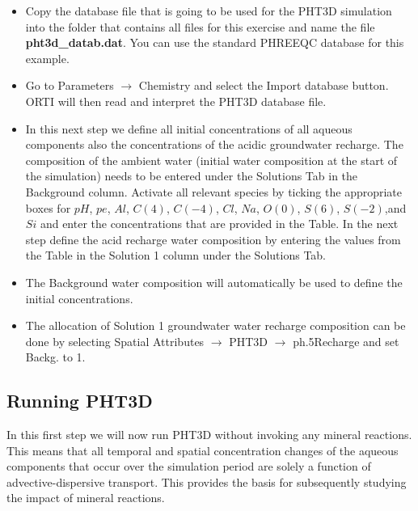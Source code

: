 \begin{itemize}

\item Copy the database file that is going to be used for the PHT3D simulation
into the folder that contains all files for this exercise and name the file {\color{red} \textbf{pht3d\_datab.dat}}. You can use the standard PHREEQC database for this example.

\item Go to {\color{blue}Parameters} $\rightarrow$ {\color{blue}Chemistry} and select the
{\color{blue}Import database} button. ORTI will then read and interpret 
the PHT3D database file.

\item In this next step we define all initial concentrations of all aqueous components
also the concentrations of the acidic groundwater recharge. The composition of the ambient water (initial water composition at the start of the simulation) 
needs to be entered under the {\color{blue}Solutions} Tab in the {\color{blue}Background} column.
Activate all relevant species by ticking the appropriate boxes for 
$pH$, $pe$,  $Al$, $C(4)$,  $C(-4)$, $Cl$, $Na$, $O(0)$, $S(6)$, $S(-2)$,and $Si$
and enter the concentrations that are provided in the Table. In the next step define the acid 
recharge water composition by entering the values from the Table in the {\color{blue}Solution 1} column 
under the {\color{blue}Solutions} Tab.  

\item The {\color{blue}Background} water composition will automatically be used to define the 
initial concentrations.

\item The allocation of {\color{blue}Solution 1} groundwater water recharge composition can be
done by selecting {\color{blue}Spatial Attributes} $\rightarrow$ {\color{blue}PHT3D} $\rightarrow$ {\color{blue} ph.5Recharge} and set {\color{blue}Backg.} to 1.  

\end{itemize}

\subsection[Running PHT3D]{Running PHT3D}

In this first step we will now run PHT3D without invoking any mineral reactions. This means that all temporal and spatial concentration changes of the aqueous components that occur over the simulation period are solely a function of advective-dispersive transport. This provides the basis for subsequently studying the impact of mineral reactions.    

